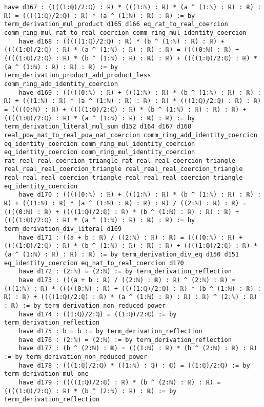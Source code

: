 \documentclass{article}
\begin{document}
\begin{tcolorbox}[colback=white!10, width=\linewidth]
\begin{lstlisting}[language=Lean4]
    have d167 : ((((1:ℚ)/2:ℚ) : ℝ) * (((1:ℕ) : ℝ) * (a ^ (1:ℕ) : ℝ) : ℝ) : ℝ) = ((((1:ℚ)/2:ℚ) : ℝ) * (a ^ (1:ℕ) : ℝ) : ℝ) := by term_derivation_mul_product d165 d166 eq_rat_to_real_coercion comm_ring_mul_rat_to_real_coercion comm_ring_mul_identity_coercion
    have d168 : (((((1:ℚ)/2:ℚ) : ℝ) * (b ^ (1:ℕ) : ℝ) : ℝ) + ((((1:ℚ)/2:ℚ) : ℝ) * (a ^ (1:ℕ) : ℝ) : ℝ) : ℝ) = ((((0:ℕ) : ℝ) + ((((1:ℚ)/2:ℚ) : ℝ) * (b ^ (1:ℕ) : ℝ) : ℝ) : ℝ) + ((((1:ℚ)/2:ℚ) : ℝ) * (a ^ (1:ℕ) : ℝ) : ℝ) : ℝ) := by term_derivation_product_add_product_less comm_ring_add_identity_coercion
    have d169 : (((((0:ℕ) : ℝ) + (((1:ℕ) : ℝ) * (b ^ (1:ℕ) : ℝ) : ℝ) : ℝ) + (((1:ℕ) : ℝ) * (a ^ (1:ℕ) : ℝ) : ℝ) : ℝ) * (((1:ℚ)/2:ℚ) : ℝ) : ℝ) = ((((0:ℕ) : ℝ) + ((((1:ℚ)/2:ℚ) : ℝ) * (b ^ (1:ℕ) : ℝ) : ℝ) : ℝ) + ((((1:ℚ)/2:ℚ) : ℝ) * (a ^ (1:ℕ) : ℝ) : ℝ) : ℝ) := by term_derivation_literal_mul_sum d152 d164 d167 d168 real_pow_nat_to_real_pow_nat_coercion comm_ring_add_identity_coercion eq_identity_coercion comm_ring_mul_identity_coercion eq_identity_coercion comm_ring_mul_identity_coercion rat_real_real_coercion_triangle rat_real_real_coercion_triangle real_real_real_coercion_triangle real_real_real_coercion_triangle real_real_real_coercion_triangle real_real_real_coercion_triangle eq_identity_coercion
    have d170 : (((((0:ℕ) : ℝ) + (((1:ℕ) : ℝ) * (b ^ (1:ℕ) : ℝ) : ℝ) : ℝ) + (((1:ℕ) : ℝ) * (a ^ (1:ℕ) : ℝ) : ℝ) : ℝ) / ((2:ℕ) : ℝ) : ℝ) = ((((0:ℕ) : ℝ) + ((((1:ℚ)/2:ℚ) : ℝ) * (b ^ (1:ℕ) : ℝ) : ℝ) : ℝ) + ((((1:ℚ)/2:ℚ) : ℝ) * (a ^ (1:ℕ) : ℝ) : ℝ) : ℝ) := by term_derivation_div_literal d169
    have d171 : ((a + b : ℝ) / ((2:ℕ) : ℝ) : ℝ) = ((((0:ℕ) : ℝ) + ((((1:ℚ)/2:ℚ) : ℝ) * (b ^ (1:ℕ) : ℝ) : ℝ) : ℝ) + ((((1:ℚ)/2:ℚ) : ℝ) * (a ^ (1:ℕ) : ℝ) : ℝ) : ℝ) := by term_derivation_div_eq d150 d151 eq_identity_coercion eq_nat_to_real_coercion d170
    have d172 : (2:ℕ) = (2:ℕ) := by term_derivation_reflection
    have d173 : (((a + b : ℝ) / ((2:ℕ) : ℝ) : ℝ) ^ (2:ℕ) : ℝ) = (((1:ℕ) : ℝ) * (((((0:ℕ) : ℝ) + ((((1:ℚ)/2:ℚ) : ℝ) * (b ^ (1:ℕ) : ℝ) : ℝ) : ℝ) + ((((1:ℚ)/2:ℚ) : ℝ) * (a ^ (1:ℕ) : ℝ) : ℝ) : ℝ) ^ (2:ℕ) : ℝ) : ℝ) := by term_derivation_non_reduced_power
    have d174 : ((1:ℚ)/2:ℚ) = ((1:ℚ)/2:ℚ) := by term_derivation_reflection
    have d175 : b = b := by term_derivation_reflection
    have d176 : (2:ℕ) = (2:ℕ) := by term_derivation_reflection
    have d177 : (b ^ (2:ℕ) : ℝ) = (((1:ℕ) : ℝ) * (b ^ (2:ℕ) : ℝ) : ℝ) := by term_derivation_non_reduced_power
    have d178 : (((1:ℚ)/2:ℚ) * ((1:ℕ) : ℚ) : ℚ) = ((1:ℚ)/2:ℚ) := by term_derivation_mul_one
    have d179 : ((((1:ℚ)/2:ℚ) : ℝ) * (b ^ (2:ℕ) : ℝ) : ℝ) = ((((1:ℚ)/2:ℚ) : ℝ) * (b ^ (2:ℕ) : ℝ) : ℝ) := by term_derivation_reflection

\end{lstlisting}
\end{tcolorbox}
\end{document}
